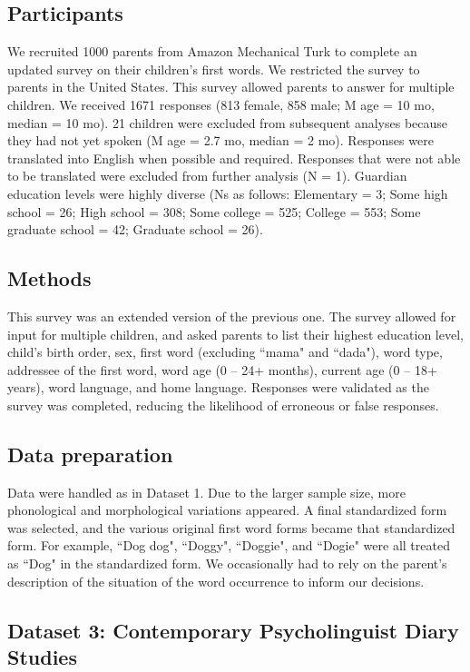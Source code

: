 \documentclass[10pt,letterpaper]{article}
\begin{document}
\subsection{Participants}
We recruited 1000 parents from Amazon Mechanical Turk to complete an updated survey on their children's first words. We restricted the survey to parents in the United States. This survey allowed parents to answer for multiple children. We received 1671 responses (813 female, 858 male; M age = 10 mo, median = 10 mo). 21 children were excluded from subsequent analyses because they had not yet spoken (M age = 2.7 mo, median = 2 mo). Responses were translated into English when possible and required. Responses that were not able to be translated were excluded from further analysis (N = 1). Guardian education levels were highly diverse (Ns as follows: Elementary = 3; Some high school = 26; High school = 308; Some college = 525; College = 553; Some graduate school = 42; Graduate school = 26). 

\subsection{Methods}
This survey was an extended version of the previous one. The survey allowed for input for multiple children, and asked parents to list their highest education level, child's birth order, sex,  first word (excluding ``mama" and ``dada"), word type, addressee of the first word, word age (0 – 24+ months), current age (0 – 18+ years), word language, and home language.  Responses were validated as the survey was completed, reducing the likelihood of erroneous or false responses. 

\subsection{Data preparation}
Data were handled as in Dataset 1. Due to the larger sample size, more phonological and morphological variations appeared. A final standardized form was selected, and the various original first word forms became that standardized form. For example,  ``Dog dog", ``Doggy", ``Doggie", and ``Dogie" were all treated as ``Dog" in the standardized form. We occasionally had to rely on the parent's description of the situation of the word occurrence to inform our decisions.

\subsection{Dataset 3: Contemporary Psycholinguist Diary Studies}
\end{document}
